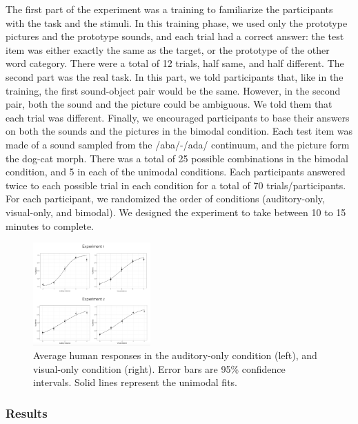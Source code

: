 \documentclass[10pt,letterpaper]{article}
\begin{document}
The first part of the experiment was a training to familiarize the participants with the task and the stimuli. In this training phase, we used only the prototype pictures and the prototype sounds, and each trial had a correct answer: the test item was either exactly the same as the target, or the prototype of the other word category. There were a total of 12 trials, half same, and half different. The second part was the real task. In this part, we told participants that, like in the training, the first sound-object pair would be the same. However, in the second pair, both the sound and the picture could be ambiguous. We told them that each trial was different. Finally, we encouraged participants to base their answers on both the sounds and the pictures in the bimodal condition. Each test item was made of a sound sampled from the /aba/-/ada/ continuum, and the picture form the dog-cat morph. There was a total of 25 possible combinations in the bimodal condition, and 5 in each of the unimodal conditions. Each participants answered twice to each possible trial in each condition for a total of 70 trials/participants. For each participant,  we randomized the order of conditions (auditory-only, visual-only, and bimodal). We designed the experiment to take between 10 to 15 minutes to complete.
\begin{figure}
\centering
\includegraphics[width=0.4\textwidth]{unimodal.png}
\caption{Average human responses in the auditory-only condition (left), and visual-only condition (right). Error bars are 95\% confidence intervals. Solid lines represent the unimodal fits. }
\label{fig:unimodal}
\end{figure}


\subsubsection{Results}
\end{document}
